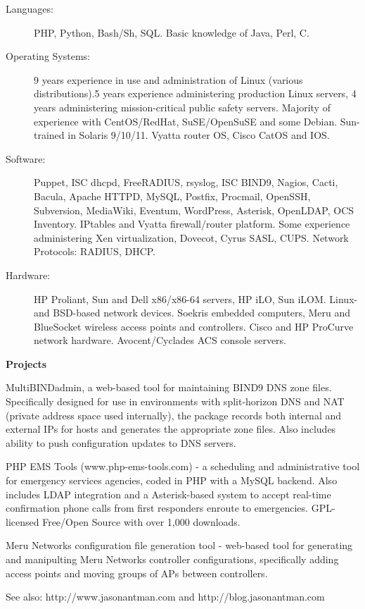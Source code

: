 \documentclass[letterpaper,11pt]{article}
\newcommand{\resheading}[1]{{\large \colorbox{mygrey}{\begin{minipage}{\textwidth}{\textbf{#1 \vphantom{p\^{E}}}}\end{minipage}}}}
\begin{document}
\begin{description}
\item[Languages:]
PHP, Python, Bash/Sh, SQL. Basic knowledge of Java, Perl, C.
\item[Operating Systems:]
9 years experience in use and administration of Linux (various
distributions).5 years experience administering production Linux servers, 4
years administering mission-critical public safety servers. Majority of experience with CentOS/RedHat, SuSE/OpenSuSE and
some Debian. Sun-trained in Solaris 9/10/11. Vyatta router OS, Cisco CatOS and IOS.
\item[Software:]
Puppet, ISC dhcpd, FreeRADIUS, rsyslog, ISC BIND9, Nagios, Cacti, Bacula, Apache HTTPD, MySQL, Postfix, Procmail, OpenSSH,
Subversion, MediaWiki, Eventum, WordPress, Asterisk, OpenLDAP, OCS Inventory. IPtables and Vyatta firewall/router
platform. Some experience administering Xen virtualization, Dovecot, Cyrus SASL, CUPS. Network Protocols: RADIUS, DHCP.


\item[Hardware:]
HP Proliant, Sun and Dell x86/x86-64 servers, HP iLO, Sun iLOM. Linux- and
BSD-based network devices. Soekris embedded computers, Meru and BlueSocket
wireless access points and controllers. Cisco and HP ProCurve network hardware. Avocent/Cyclades ACS console servers.
\end{description}


\resheading{Projects}

\begin{description}
\item MultiBINDadmin, a web-based tool for maintaining BIND9 DNS
  zone files. Specifically designed for use in environments with split-horizon
  DNS and NAT (private address space used internally), the package records
  both internal and external IPs for hosts and generates the appropriate zone
  files. Also includes ability to push configuration updates to DNS servers.
\item[2007--Present:] PHP EMS Tools (www.php-ems-tools.com) - a scheduling and
  administrative tool for emergency services agencies, coded in PHP with a MySQL
  backend. Also includes LDAP integration and a Asterisk-based system to accept
  real-time confirmation phone calls from first responders enroute to
  emergencies. GPL-licensed Free/Open Source with over 1,000 downloads.
\item[In Progress] Meru Networks configuration file generation tool - web-based tool
  for generating and manipulting Meru Networks controller configurations, specifically
  adding access points and moving groups of APs between controllers.
\item See also: http://www.jasonantman.com and http://blog.jasonantman.com

\end{description}
\end{document}

